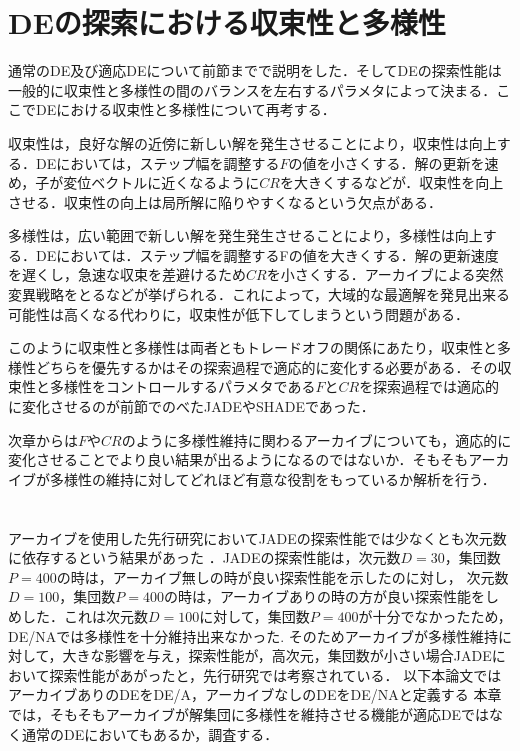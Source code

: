 \documentclass[a4paper,11pt,oneside,openany]{jsbook}
\begin{document}
\section{DEの探索における収束性と多様性}
通常のDE及び適応DEについて前節までで説明をした．そしてDEの探索性能は一般的に収束性と多様性の間のバランスを左右するパラメタによって決まる．ここでDEにおける収束性と多様性について再考する．

収束性は，良好な解の近傍に新しい解を発生させることにより，収束性は向上する．DEにおいては，ステップ幅を調整する$F$の値を小さくする．解の更新を速め，子が変位ベクトルに近くなるように$CR$を大きくするなどが．収束性を向上させる．収束性の向上は局所解に陥りやすくなるという欠点がある．

多様性は，広い範囲で新しい解を発生発生させることにより，多様性は向上する．DEにおいては．ステップ幅を調整するFの値を大きくする．解の更新速度を遅くし，急速な収束を差避けるため$CR$を小さくする．アーカイブによる突然変異戦略をとるなどが挙げられる．これによって，大域的な最適解を発見出来る可能性は高くなる代わりに，収束性が低下してしまうという問題がある．

このように収束性と多様性は両者ともトレードオフの関係にあたり，収束性と多様性どちらを優先するかはその探索過程で適応的に変化する必要がある．その収束性と多様性をコントロールするパラメタである$F$と$CR$を探索過程では適応的に変化させるのが前節でのべたJADEやSHADEであった．

次章からは$F$や$CR$のように多様性維持に関わるアーカイブについても，適応的に変化させることでより良い結果が出るようになるのではないか．そもそもアーカイブが多様性の維持に対してどれほど有意な役割をもっているか解析を行う．

\section{}
アーカイブを使用した先行研究においてJADEの探索性能では少なくとも次元数に依存するという結果があった \cite{JADE} ．JADEの探索性能は，次元数$D=30$，集団数$P=400$の時は，アーカイブ無しの時が良い探索性能を示したのに対し，
次元数$D=100$，集団数$P=400$の時は，アーカイブありの時の方が良い探索性能をしめした．これは次元数$D=100$に対して，集団数$P=400$が十分でなかったため，DE/NAでは多様性を十分維持出来なかった.
そのためアーカイブが多様性維持に対して，大きな影響を与え，探索性能が，高次元，集団数が小さい場合JADEにおいて探索性能があがったと，先行研究では考察されている．
以下本論文ではアーカイブありのDEをDE/A，アーカイブなしのDEをDE/NAと定義する
本章では，そもそもアーカイブが解集団に多様性を維持させる機能が適応DEではなく通常のDEにおいてもあるか，調査する．
\end{document}
